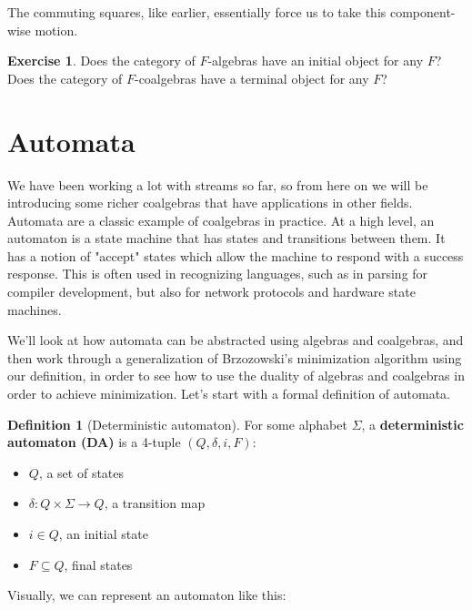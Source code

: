 \documentclass{article}
\theoremstyle{plain}
\theoremstyle{definition}
\newtheorem{definition}{Definition}
\newtheorem{exercise}{Exercise}
\begin{document}
The commuting squares, like earlier, essentially force us to take this component-wise motion.



\begin{exercise}
Does the category of \ensuremath{F}-algebras have an initial object for any \ensuremath{F}? Does the category of \ensuremath{F}-coalgebras have a terminal object for any \ensuremath{F}?
\end{exercise}




\section{Automata}


We have been working a lot with streams so far, so from here on we will be introducing some richer coalgebras that have applications in other fields. Automata are a classic example of coalgebras in practice. At a high level, an automaton is a state machine that has states and transitions between them. It has a notion of "accept" states which allow the machine to respond with a success response. This is often used in recognizing languages, such as in parsing for compiler development, but also for network protocols and hardware state machines.

We'll look at how automata can be abstracted using algebras and coalgebras, and then work through a generalization of Brzozowski's minimization algorithm using our definition, in order to see how to use the duality of algebras and coalgebras in order to achieve minimization. Let's start with a formal definition of automata.

\begin{definition}[Deterministic automaton]
 For some alphabet \ensuremath{\Sigma}, a \textbf{deterministic automaton (DA)} is a 4-tuple \ensuremath{\left( Q, \delta , i, F \right)}: \begin{itemize}
\item \ensuremath{Q}, a set of states
\item \ensuremath{\delta : Q \times \Sigma \rightarrow Q}, a transition map
\item \ensuremath{i \in Q}, an initial state
\item \ensuremath{F \subseteq Q}, final states
\end{itemize}

\end{definition}


Visually, we can represent an automaton like this:
\end{document}
